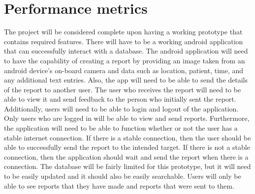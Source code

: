\documentclass[journal,10pt,onecolumn,draftclsnofoot,]{IEEEtran}
\begin{document}
\section{Performance metrics}
\label{sec:theory}
	The project will be considered complete upon having a working prototype that contains required features. There will have to be a working android application that can successfully interact with a database. The android application will need to have the capability of creating a report by providing an image taken from an android device’s on-board camera and data such as location, patient, time, and any additional text entries. Also, the app will need to be able to send the details of the report to another user. The user who receives the report will need to be able to view it and send feedback to the person who initially sent the report. Additionally, users will need to be able to login and logout of the application. Only users who are logged in will be able to view and send reports. Furthermore, the application will need to be able to function whether or not the user has a stable internet connection. If there is a stable connection, then the user should be able to successfully send the report to the intended target. If there is not a stable connection, then the application should wait and send the report when there is a connection. The database will be fairly limited for this prototype, but it will need to be easily updated and it should also be easily searchable. Users will only be able to see reports that they have made and reports that were sent to them.
\end{document}
